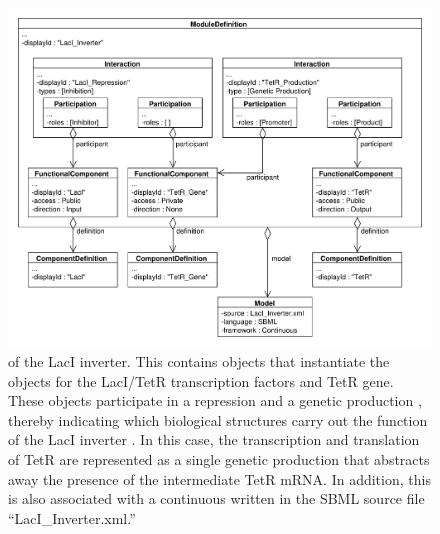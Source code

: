 \begin{figure}[ht]
\begin{center}
\includegraphics[width=\textwidth]{example_uml/toggle_3}
\caption[]{ of the LacI inverter. This  contains  objects that instantiate the  objects for the LacI/TetR transcription factors and TetR gene. These  objects participate in a repression  and a genetic production , thereby indicating which biological structures carry out the function of the LacI inverter . In this case, the transcription and translation of TetR are represented as a single genetic production  that abstracts away the presence of the intermediate TetR mRNA.  In addition, this  is also associated with a continuous  written in the SBML source file ``LacI\_Inverter.xml.''}
\label{uml:ex_mod_def}
\end{center}
\end{figure}

